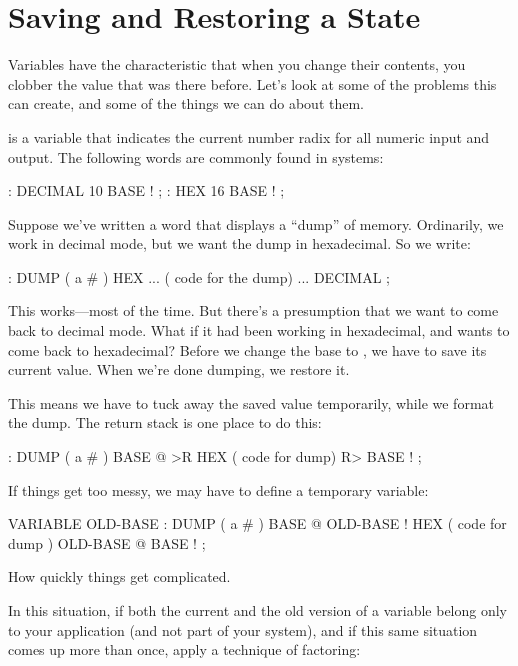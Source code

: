 \section{Saving and Restoring a State}%
%

Variables have the characteristic that when you change their contents,
you clobber the value that was there before. Let's look at some of the
problems this can create, and some of the things we can do about them.

%
 is a variable that indicates the current
number radix for all numeric input and output. The following words are
commonly found in \Forth{} systems:

\begin{Code}
: DECIMAL   10 BASE ! ;
: HEX   16 BASE ! ;
\end{Code}
Suppose we've written a word that displays a ``dump'' of memory. Ordinarily,
we work in decimal mode, but we want the dump in hexadecimal. So we write:

\begin{Code}
: DUMP  ( a # )
   HEX   ...   ( code for the dump) ... DECIMAL ;
\end{Code}
This works---most of the time. But there's a presumption that we want to
come back to decimal mode. What if it had been working in hexadecimal,
and wants to come back to hexadecimal? Before we change the base to
, we have to save its current value. When we're done dumping, we
restore it.

This means we have to tuck away the saved value temporarily,
while we format the dump. The return stack is one place to do this:

\begin{Code}
: DUMP  ( a # )
   BASE @ >R  HEX   ( code for dump)  R> BASE ! ;
\end{Code}
If things get too messy, we may have to define a temporary variable:

\begin{Code}
VARIABLE OLD-BASE
: DUMP  ( a # )
   BASE @  OLD-BASE !  HEX ( code for dump )
   OLD-BASE @  BASE ! ;
\end{Code}
How quickly things get complicated.%

In this situation, if both the current and the old version of a variable
belong only to your application (and not part of your system), and if this
same situation comes up more than once, apply a technique of factoring:

